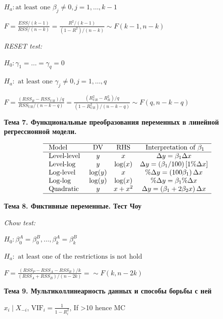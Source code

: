 \documentclass[a4paper,8pt]{article} %
\begin{document}
$H_a: \text{at least one } \beta_j \neq 0, j=1,\dots,k-1  $

$F=\frac{E S S /(k-1)}{R S S /(n-k)} =\frac{R^2 /(k-1)}{(1-R^2) /(n-k)} \sim F(k-1,n-k)$

\textit{RESET test:}


$H_0: \gamma_1 = \dots = \gamma_q = 0  $

$H_a: \text{ at least one } \gamma_j \neq 0, j=1,\dots,q  $

$F=\frac{\left( RSS_{R}-RSS_{UR}\right) / q}{RSS_{UR} /(n-k-q)}=\frac{\left( R^2_{UR}-R^2_{R}\right) / q}{(1- R^2_{UR}) /(n-k-q)} \sim F(q,n-k-q) $




\textbf{Тема 7. Функциональные преобразования переменных в линейной регрессионной модели.}

\begin{equation}
\begin{array}{lccc}
\hline \text { Model } & \text { DV } & \text { RHS } & \text { Interpretation of } \beta_{1} \\
\hline \text { Level-level } & y & x & \Delta y=\beta_{1} \Delta x \\
\text { Level-log } & y & \log (x) & \Delta y=\left(\beta_{1} / 100\right)[1 \% \Delta x] \\
\text { Log-level } & \log (y) & x & \% \Delta y=\left(100 \beta_{1}\right) \Delta x \\
\text { Log-log } & \log (y) & \log (x) & \% \Delta y=\beta_{1} \% \Delta x \\
\text { Quadratic } & y & x+x^{2} & \Delta y=\left(\beta_{1}+2 \beta_{2} x\right) \Delta x \\
\hline
\end{array}
\end{equation}





\textbf{Тема 8. Фиктивные переменные. Тест Чоу}

\textit{Chow test:}

$H_0: \beta_0^A  = \beta_0^B,   \dots , \beta_k^A  = \beta_k^B $

$H_a: \text{ at least one  of the restrictions is not hold }  $

$F=\frac{\left(R S S_{P}-R S S_{A}-R S S_{B}\right) / k}{\left(R S S_{A}+R S S_{B}\right) /(n-2 k)}  =  
\sim F(k,n-2k) $


\textbf{Тема 9. Мультиколлинеарность данных и способы борьбы с
ней}

$x_i \mid X_{-i}$,  $\mathrm{VIF}_{i}=\frac{1}{1-R_{i}^{2}}$,  If >10 hence MC



	
\end{document}
